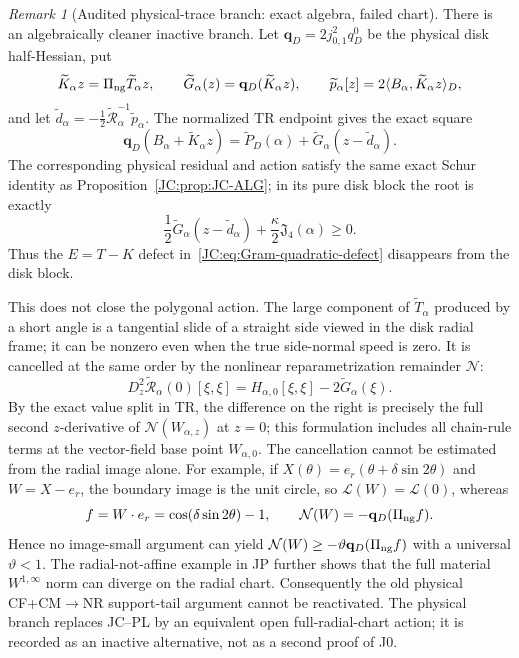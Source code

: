 \documentclass[11pt]{amsart}
\providecommand{\mathscr}{\mathcal}
\numberwithin{equation}{section}
\theoremstyle{definition}
\theoremstyle{remark}
\newtheorem{remark}[theorem]{Remark}
\newcommand{\Jfour}{\mathfrak J_4}
\providecommand{\mathscr}[1]{\mathcal{#1}}
\begin{document}
\begin{remark}[Audited physical-trace branch: exact algebra, failed chart]
There is an algebraically cleaner inactive branch.  Let
$\mathbf q_D=2j_{0,1}^2q_D^0$ be the physical disk half-Hessian, put
\[
 \widetilde K_\alpha z=\Pi_{\rm ng}\widetilde T_\alpha z,
 \qquad
 \widetilde G_\alpha(z)=\mathbf q_D(\widetilde K_\alpha z),
 \qquad
 \widetilde p_\alpha[z]
 =2\langle B_\alpha,\widetilde K_\alpha z\rangle_D,
\]
and let
$\widetilde d_\alpha=-\tfrac12\widetilde{\mathcal R}_\alpha^{-1}
\widetilde p_\alpha$.  The normalized TR endpoint gives the exact square
\[
 \mathbf q_D(B_\alpha+\widetilde K_\alpha z)
 =\widetilde P_D(\alpha)
  +\widetilde G_\alpha(z-\widetilde d_\alpha).
\]
The corresponding physical residual and action satisfy the same exact
Schur identity as Proposition~\ref{JC:prop:JC-ALG}; in its pure disk block
the root is exactly
\[
 \frac12\widetilde G_\alpha(z-\widetilde d_\alpha)
 +\frac\kappa2\Jfour(\alpha)\ge0.
\]
Thus the $E=T-K$ defect in~\eqref{JC:eq:Gram-quadratic-defect} disappears
from the disk block.

This does not close the polygonal action.  The large component of
$\widetilde T_\alpha$ produced by a short angle is a tangential slide of a
straight side viewed in the disk radial frame; it can be nonzero even
when the true side-normal speed is zero.  It is cancelled at the same
order by the nonlinear reparametrization remainder $\mathcal N$:
\[
 D_z^2\widetilde{\mathscr R}_\alpha(0)[\xi,\xi]
 =H_{\alpha,0}[\xi,\xi]-2\widetilde G_\alpha(\xi).
\]
By the exact value split in TR, the difference on the right is precisely
the full second $z$-derivative of $\mathcal N(W_{\alpha,z})$ at $z=0$;
this formulation includes all chain-rule terms at the vector-field base
point $W_{\alpha,0}$.
The cancellation cannot be estimated from the radial image alone.  For
example, if
$X(\theta)=e_r(\theta+\delta\sin2\theta)$ and $W=X-e_r$, the boundary
image is the unit circle, so $\mathcal L(W)=\mathcal L(0)$, whereas
\[
 f=W\cdot e_r=\cos(\delta\sin2\theta)-1,
 \qquad
 \mathcal N(W)=-\mathbf q_D(\Pi_{\rm ng}f).
\]
Hence no image-small argument can yield
$\mathcal N(W)\ge-\vartheta\mathbf q_D(\Pi_{\rm ng}f)$ with a universal
$\vartheta<1$.  The radial-not-affine example in JP further shows that
the full material $W^{1,\infty}$ norm can diverge on the radial chart.
Consequently the old physical CF+CM$\to$NR support-tail argument cannot
be reactivated.  The physical branch replaces JC--PL by an equivalent
open full-radial-chart action; it is recorded as an inactive alternative,
not as a second proof of J0.
\end{remark}
\end{document}
